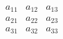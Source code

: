 $$\begin{array}{ccc}{a}_{11}&{a}_{12}&{a}_{13}\\ {a}_{21}&{a}_{22}&{a}_{23}\\ {a}_{31}&{a}_{32}&{a}_{33}\\ \end{array}$$
